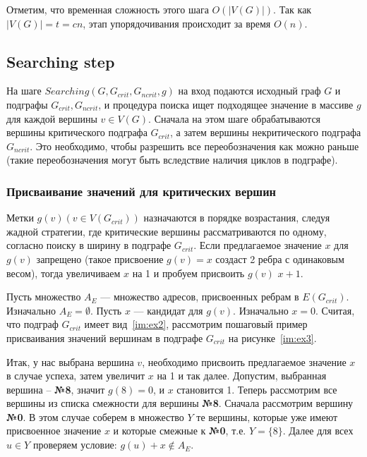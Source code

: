 \documentclass[specialist,
               substylefile = spbu.rtx,
               subf,href,colorlinks=true, 12pt]{disser}
\begin{document}
Отметим, что временная сложность этого шага $\mathit{O}(|V(G)|)$. Так как $|V(G)| = t = cn$, этап упорядочивания происходит за время $\mathit{O}(n)$.

\newpage

\subsection{Searching step}

На шаге $Searching (G, G_{crit}, G_{ncrit}, g)$ на вход подаются исходный граф $G$ и подграфы $G_{crit}, G_{ncrit}$, и процедура поиска ищет подходящее значение в массиве $g$ для каждой вершины $v \in V(G)$. Сначала на этом шаге обрабатываются вершины критического подграфа $G_{crit}$, а затем вершины некритического подграфа $G_{ncrit}$. Это необходимо, чтобы разрешить все переобозначения как можно раньше (такие переобозначения могут быть вследствие наличия циклов в подграфе).

\subsubsection{Присваивание значений для критических вершин}

Метки $g(v) (v \in V(G_{crit}))$ назначаются в порядке возрастания, следуя жадной стратегии, где критические вершины рассматриваются по одному, согласно поиску в ширину в подграфе $G_{crit}$. Если предлагаемое значение $x$ для $g(v)$ запрещено (такое присвоение $g(v) = x$ создаст 2 ребра с одинаковым весом), тогда увеличиваем $x$ на 1 и пробуем присвоить $g(v)$ $x+1$.

Пусть множество $A_E$ --- множество адресов, присвоенных ребрам в $E(G_{crit})$. Изначально $A_E = \emptyset$. Пусть $x$ --- кандидат для $g(v)$. Изначально $x = 0$. Считая, что подграф $G_{crit}$ имеет вид~\ref{im:ex2}, рассмотрим пошаговый пример присваивания значений вершинам в подграфе $G_{crit}$ на рисунке~\ref{im:ex3}.

Итак, у нас выбрана вершина $v$, необходимо присвоить предлагаемое значение $x$ в случае успеха, затем увеличит $x$ на 1 и так далее. Допустим, выбранная вершина -- \textbf{№8}, значит $g(8) = 0$, и $x$ становится 1. Теперь рассмотрим все вершины из списка смежности для вершины \textbf{№8}. Сначала рассмотрим вершину \textbf{№0}. В этом случае соберем в множество $Y$ те вершины, которые уже имеют присвоенное значение $x$ и которые смежные к \textbf{№0}, т.е. $Y = \{8\}$. Далее для всех $u \in Y$ проверяем условие: $g(u) + x \notin A_E$.
\end{document}
